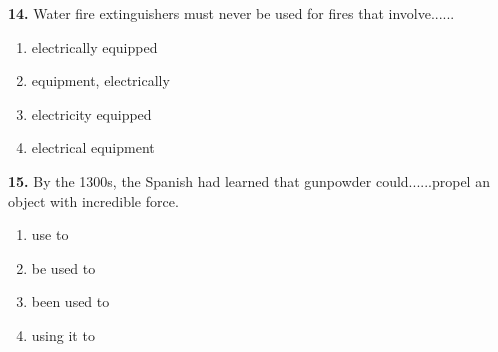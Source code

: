\documentclass[12pt]{article}
\begin{document}
\noindent\textbf{14.} Water fire extinguishers must never be used for fires that involve......
\begin{enumerate}[label=(\Alph*),leftmargin=*,itemsep=0.2em]
\item electrically equipped
\item equipment, electrically
\item electricity equipped
\item electrical equipment
\end{enumerate}
\par
\vspace{0.25\baselineskip}
\noindent\textbf{15.} By the 1300s, the Spanish had learned that gunpowder could......propel an object with incredible force.
\begin{enumerate}[label=(\Alph*),leftmargin=*,itemsep=0.2em]
\item use to
\item be used to
\item been used to
\item using it to
\end{enumerate}
\par
\vspace{0.25\baselineskip}
\end{document}
